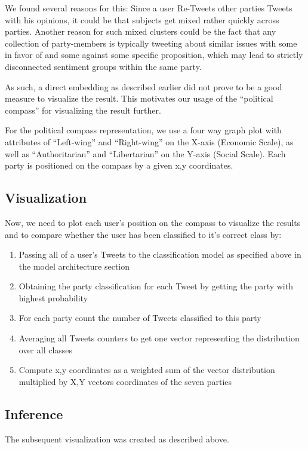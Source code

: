 \documentclass[10pt, oneside]{article}
\begin{document}
\begin{multicols}{2}
We found several reasons for this:
Since a user Re-Tweets other parties Tweets with his opinions, it could be that subjects get mixed rather quickly across parties.
Another reason for such mixed clusters could be the fact that any collection of party-members is typically tweeting about similar issues with some in favor of and some against some specific proposition, which may lead to strictly disconnected sentiment groups within the same party.

As such, a direct embedding as described earlier did not prove to be a good measure to visualize the result. This motivates our usage of the ``political compass'' \cite{PoliticalCompass2017} for visualizing the result further. 

For the political compass representation, we use a four way graph plot with attributes of ``Left-wing'' and ``Right-wing'' on the X-axis (Economic Scale), as well as ``Authoritarian'' and ``Libertarian'' on the Y-axis (Social Scale). Each party is positioned on the compass by a given x,y coordinates.
\subsection{Visualization}

Now, we need to plot each user's position on the compass to visualize the results and to compare whether the user has been classified to it’s correct class by:
\begin{enumerate}
	\item Passing all of a user's Tweets to the classification model as specified above in the model architecture section
	\item Obtaining the party classification for each Tweet by getting the party with highest probability
	\item For each party count the number of Tweets classified to this party
	\item Averaging all Tweets counters to get one vector representing the distribution over all classes
	\item Compute x,y coordinates as a weighted sum of the vector distribution multiplied by X,Y vectors coordinates of the seven parties
\end{enumerate}

\subsection{Inference}

The subsequent visualization was created as described above.


\end{multicols}
\end{document}
